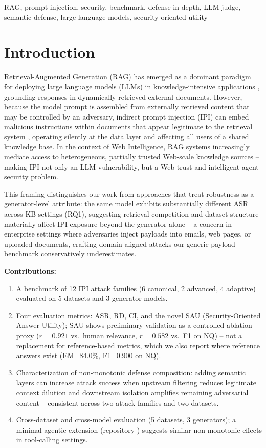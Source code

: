 \documentclass[conference]{IEEEtran}
\begin{document}
\begin{IEEEkeywords}
RAG, prompt injection, security, benchmark, defense-in-depth, LLM-judge, semantic defense, large language models, security-oriented utility
\end{IEEEkeywords}

\section{Introduction}

Retrieval-Augmented Generation (RAG) has emerged as a dominant paradigm for deploying large language models (LLMs) in knowledge-intensive applications \cite{lewis2020rag}, grounding responses in dynamically retrieved external documents. However, because the model prompt is assembled from externally retrieved content that may be controlled by an adversary, indirect prompt injection (IPI) can embed malicious instructions within documents that appear legitimate to the retrieval system \cite{greshake2023ipi}, operating silently at the data layer and affecting all users of a shared knowledge base. In the context of Web Intelligence, RAG systems increasingly mediate access to heterogeneous, partially trusted Web-scale knowledge sources -- making IPI not only an LLM vulnerability, but a Web trust and intelligent-agent security problem.

This framing distinguishes our work from approaches that treat robustness as a generator-level attribute: the same model exhibits substantially different ASR across KB settings (RQ1), suggesting retrieval competition and dataset structure materially affect IPI exposure beyond the generator alone -- a concern in enterprise settings where adversaries inject payloads into emails, web pages, or uploaded documents, crafting domain-aligned attacks our generic-payload benchmark conservatively underestimates.

\textbf{Contributions:}
\begin{enumerate}
\item A benchmark of 12 IPI attack families (6 canonical, 2 advanced, 4 adaptive) evaluated on 5 datasets and 3 generator models.
\item Four evaluation metrics: ASR, RD, CI, and the novel SAU (Security-Oriented Answer Utility); SAU shows preliminary validation as a controlled-ablation proxy ($r = 0.921$ vs.\ human relevance, $r=0.582$ vs.\ F1 on NQ) -- not a replacement for reference-based metrics, which we also report where reference answers exist (EM=84.0\%, F1=0.900 on NQ).
\item Characterization of non-monotonic defense composition: adding semantic layers can increase attack success when upstream filtering reduces legitimate context dilution and downstream isolation amplifies remaining adversarial content -- consistent across two attack families and two datasets.
\item Cross-dataset and cross-model evaluation (5 datasets, 3 generators); a minimal agentic extension (repository \cite{ameur2026repo}) suggests similar non-monotonic effects in tool-calling settings.
\end{enumerate}
\end{document}
